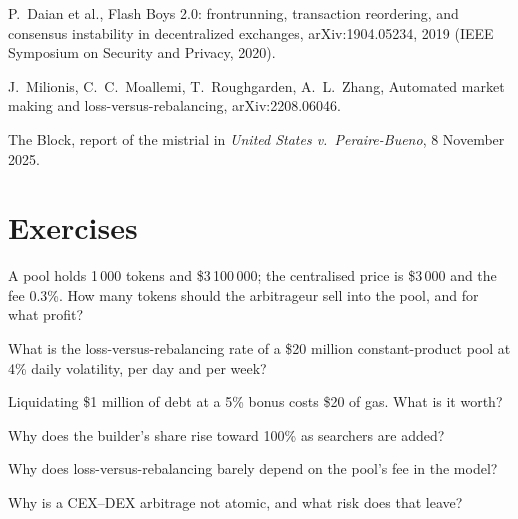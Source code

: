 \begin{omsources}
\item P.~Daian et al., Flash Boys 2.0: frontrunning, transaction reordering, and consensus instability in decentralized exchanges,
arXiv:1904.05234, 2019 (IEEE Symposium on Security and Privacy, 2020).
\item J.~Milionis, C.~C.~Moallemi, T.~Roughgarden, A.~L.~Zhang, Automated market making and loss-versus-rebalancing, arXiv:2208.06046.
\item The Block, report of the mistrial in \emph{United States v.\ Peraire-Bueno}, 8 November 2025.
\end{omsources}

\section{Exercises}

\begin{exercise}[$\star$]\label{exo:hf:on-chain-trading:1}
A pool holds 1\,000 tokens and \$3\,100\,000; the centralised price is \$3\,000 and the fee 0.3\%. How many tokens should the arbitrageur sell into
the pool, and for what profit?
\end{exercise}

\begin{exercise}[$\star$]\label{exo:hf:on-chain-trading:2}
What is the loss-versus-rebalancing rate of a \$20 million constant-product pool at 4\% daily volatility, per day and per week?
\end{exercise}

\begin{exercise}[$\star$]\label{exo:hf:on-chain-trading:3}
Liquidating \$1 million of debt at a 5\% bonus costs \$20 of gas. What is it worth?
\end{exercise}

\begin{exercise}[$\star\star$]\label{exo:hf:on-chain-trading:4}
Why does the builder's share rise toward 100\% as searchers are added?
\end{exercise}

\begin{exercise}[$\star\star$]\label{exo:hf:on-chain-trading:5}
Why does loss-versus-rebalancing barely depend on the pool's fee in the model?
\end{exercise}

\begin{exercise}[$\star\star$]\label{exo:hf:on-chain-trading:6}
Why is a CEX--DEX arbitrage not atomic, and what risk does that leave?
\end{exercise}

